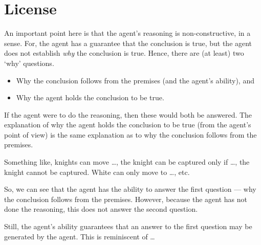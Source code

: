 \documentclass[10pt]{article}
\begin{document}
\section{License}
\label{sec:license}


\begin{note}[Constructive]
  An important point here is that the agent's reasoning is non-constructive, in a sense.
  For, the agent has a guarantee that the conclusion is true, but the agent does not establish \emph{why} the conclusion is true.
  Hence, there are (at least) two `why' questions.
  \begin{itemize}
  \item Why the conclusion follows from the premises (and the agent's ability), and
  \item Why the agent holds the conclusion to be true.
  \end{itemize}
  If the agent were to do the reasoning, then these would both be answered.
  The explanation of why the agent holds the conclusion to be true (from the agent's point of view) is the same explanation as to why the conclusion follows from the premises.

  Something like, knights can move \dots, the knight can be captured only if \dots, the knight cannot be captured.
  White can only move to \dots, etc.\

  So, we can see that the agent has the ability to answer the first question --- why the conclusion follows from the premises.
  However, because the agent has not done the reasoning, this does not answer the second question.

  Still, the agent's ability guarantees that an answer to the first question may be generated by the agent.
  This is reminiscent of \citeauthor{Davidson:2001aa} \dots
\end{note}
\end{document}
